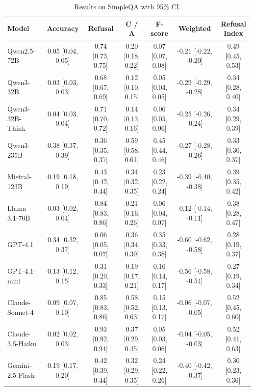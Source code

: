 \documentclass{article} %
\theoremstyle{definition}
\begin{document}
\begin{table}[t]
    \centering
    \tiny
    \caption{Results on SimpleQA with 95\% CI.}
    \label{tab:simpleqa_model_comparison}
    \begin{tabularx}{\textwidth}{X c c c c c c}
    \toprule
    \textbf{Model} & \textbf{Accuracy} & \textbf{Refusal} & \textbf{C / A} & \textbf{F-score} & \textbf{Weighted} & \textbf{Refusal Index} \\
    \midrule
    Qwen2.5-72B                    & 0.05 [0.04, 0.05] & 0.74 [0.73, 0.75] & 0.20 [0.18, 0.22] & 0.07 [0.07, 0.08] & -0.21 [-0.22, -0.20] & 0.49 [0.45, 0.53] \\
    Qwen3-32B                      & 0.03 [0.03, 0.03] & 0.68 [0.67, 0.69] & 0.12 [0.10, 0.15] & 0.05 [0.04, 0.05] & -0.29 [-0.29, -0.28] & 0.34 [0.28, 0.40] \\
    Qwen3-32B-Think                & 0.04 [0.03, 0.04] & 0.71 [0.70, 0.72] & 0.14 [0.13, 0.16] & 0.06 [0.05, 0.06] & -0.25 [-0.26, -0.24] & 0.34 [0.29, 0.39] \\
    Qwen3-235B                     & 0.38 [0.37, 0.39] & 0.36 [0.35, 0.37] & 0.59 [0.58, 0.61] & 0.45 [0.44, 0.46] & -0.27 [-0.28, -0.26] & 0.33 [0.30, 0.37] \\
    Mistral-123B                   & 0.19 [0.18, 0.19] & 0.43 [0.42, 0.44] & 0.34 [0.32, 0.35] & 0.23 [0.22, 0.24] & -0.39 [-0.40, -0.38] & 0.39 [0.35, 0.42] \\
    Llama-3.1-70B                  & 0.03 [0.02, 0.04] & 0.84 [0.83, 0.86] & 0.21 [0.16, 0.26] & 0.06 [0.04, 0.07] & -0.12 [-0.14, -0.11] & 0.38 [0.28, 0.47] \\
    GPT-4.1                        & 0.34 [0.32, 0.37] & 0.06 [0.05, 0.07] & 0.36 [0.34, 0.39] & 0.35 [0.33, 0.38] & -0.60 [-0.62, -0.58] & 0.28 [0.19, 0.37] \\
    GPT-4.1-mini                   & 0.13 [0.12, 0.15] & 0.31 [0.29, 0.33] & 0.19 [0.17, 0.21] & 0.16 [0.14, 0.17] & -0.56 [-0.58, -0.54] & 0.27 [0.19, 0.34] \\
    Claude-Sonnet-4                & 0.09 [0.07, 0.10] & 0.85 [0.83, 0.86] & 0.58 [0.52, 0.63] & 0.15 [0.13, 0.17] & -0.06 [-0.07, -0.05] & 0.52 [0.45, 0.60] \\
    Claude-3.5-Haiku               & 0.02 [0.02, 0.03] & 0.93 [0.92, 0.94] & 0.37 [0.29, 0.45] & 0.05 [0.03, 0.06] & -0.04 [-0.05, -0.03] & 0.52 [0.41, 0.63] \\
    Gemini-2.5-Flash               & 0.19 [0.17, 0.20] & 0.42 [0.39, 0.44] & 0.32 [0.29, 0.35] & 0.24 [0.22, 0.26] & -0.40 [-0.42, -0.37] & 0.30 [0.23, 0.36] \\

\end{tabularx}
\end{table}
\end{document}
